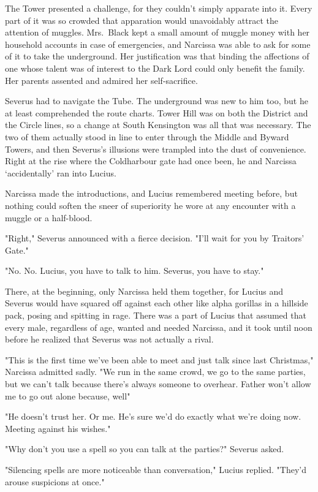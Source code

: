 The Tower presented a challenge, for they couldn't simply apparate into it. Every part of it was so crowded that apparation would unavoidably attract the attention of muggles. Mrs.~Black kept a small amount of muggle money with her household accounts in case of emergencies, and Narcissa was able to ask for some of it to take the underground. Her justification was that binding the affections of one whose talent was of interest to the Dark Lord could only benefit the family. Her parents assented and admired her self-sacrifice.

Severus had to navigate the Tube. The underground was new to him too, but he at least comprehended the route charts. Tower Hill was on both the District and the Circle lines, so a change at South Kensington was all that was necessary. The two of them actually stood in line to enter through the Middle and Byward Towers, and then Severus's illusions were trampled into the dust of convenience. Right at the rise where the Coldharbour gate had once been, he and Narcissa `accidentally' ran into Lucius.

Narcissa made the introductions, and Lucius remembered meeting before, but nothing could soften the sneer of superiority he wore at any encounter with a muggle or a half-blood.

"Right," Severus announced with a fierce decision. "I'll wait for you by Traitors' Gate."

"No. No. Lucius, you have to talk to him. Severus, you have to stay."

There, at the beginning, only Narcissa held them together, for Lucius and Severus would have squared off against each other like alpha gorillas in a hillside pack, posing and spitting in rage. There was a part of Lucius that assumed that every male, regardless of age, wanted and needed Narcissa, and it took until noon before he realized that Severus was not actually a rival.

"This is the first time we've been able to meet and just talk since last Christmas," Narcissa admitted sadly. "We run in the same crowd, we go to the same parties, but we can't talk because there's always someone to overhear. Father won't allow me to go out alone because, well{\el}"

"He doesn't trust her. Or me. He's sure we'd do exactly what we're doing now. Meeting against his wishes."

"Why don't you use a spell so you can talk at the parties?" Severus asked.

"Silencing spells are more noticeable than conversation," Lucius replied. "They'd arouse suspicions at once."

